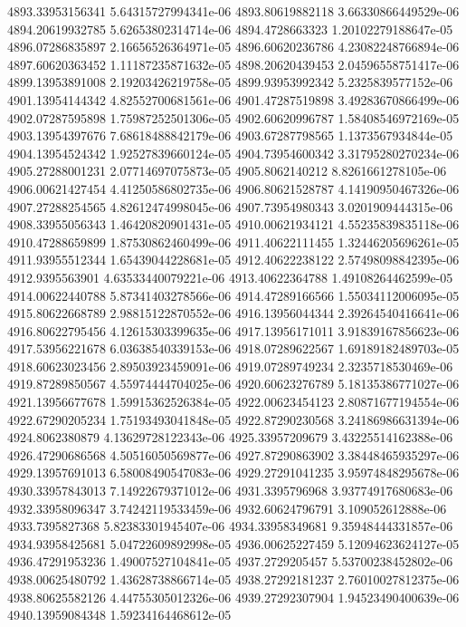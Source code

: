 {4893.33953156341 5.64315727994341e-06
4893.80619882118 3.66330866449529e-06
4894.20619932785 5.62653802314714e-06
4894.4728663323 1.20102279188647e-05
4896.07286835897 2.16656526364971e-05
4896.60620236786 4.23082248766894e-06
4897.60620363452 1.11187235871632e-05
4898.20620439453 2.04596558751417e-06
4899.13953891008 2.19203426219758e-05
4899.93953992342 5.2325839577152e-06
4901.13954144342 4.82552700681561e-06
4901.47287519898 3.49283670866499e-06
4902.07287595898 1.75987252501306e-05
4902.60620996787 1.58408546972169e-05
4903.13954397676 7.68618488842179e-06
4903.67287798565 1.1373567934844e-05
4904.13954524342 1.92527839660124e-05
4904.73954600342 3.31795280270234e-06
4905.27288001231 2.07714697075873e-05
4905.8062140212 8.8261661278105e-06
4906.00621427454 4.41250586802735e-06
4906.80621528787 4.14190950467326e-06
4907.27288254565 4.82612474998045e-06
4907.73954980343 3.0201909444315e-06
4908.33955056343 1.46420820901431e-05
4910.00621934121 4.55235839835118e-06
4910.47288659899 1.87530862460499e-06
4911.40622111455 1.32446205696261e-05
4911.93955512344 1.65439044228681e-05
4912.40622238122 2.57498098842395e-06
4912.9395563901 4.63533440079221e-06
4913.40622364788 1.49108264462599e-05
4914.00622440788 5.87341403278566e-06
4914.47289166566 1.55034112006095e-05
4915.80622668789 2.98815122870552e-06
4916.13956044344 2.39264540416641e-06
4916.80622795456 4.12615303399635e-06
4917.13956171011 3.91839167856623e-06
4917.53956221678 6.03638540339153e-06
4918.07289622567 1.69189182489703e-05
4918.60623023456 2.89503923459091e-06
4919.07289749234 2.3235718530469e-06
4919.87289850567 4.55974444704025e-06
4920.60623276789 5.18135386771027e-06
4921.13956677678 1.59915362526384e-05
4922.00623454123 2.80871677194554e-06
4922.67290205234 1.75193493041848e-05
4922.87290230568 3.24186986631394e-06
4924.8062380879 4.13629728122343e-06
4925.33957209679 3.43225514162388e-06
4926.47290686568 4.50516050569877e-06
4927.87290863902 3.38448465935297e-06
4929.13957691013 6.58008490547083e-06
4929.27291041235 3.95974848295678e-06
4930.33957843013 7.14922679371012e-06
4931.3395796968 3.93774917680683e-06
4932.33958096347 3.74242119533459e-06
4932.60624796791 3.109052612888e-06
4933.7395827368 5.82383301945407e-06
4934.33958349681 9.35948444331857e-06
4934.93958425681 5.04722609892998e-05
4936.00625227459 5.12094623624127e-05
4936.47291953236 1.49007527104841e-05
4937.2729205457 5.53700238452802e-06
4938.00625480792 1.43628738866714e-05
4938.27292181237 2.76010027812375e-06
4938.80625582126 4.44755305012326e-06
4939.27292307904 1.94523490400639e-06
4940.13959084348 1.59234164468612e-05
}
